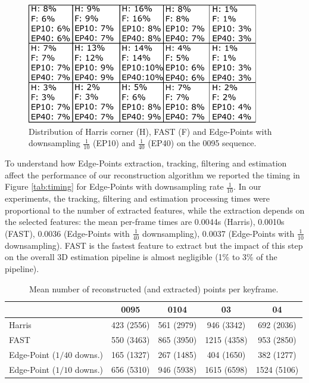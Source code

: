 \begin{figure}[t]
  \centering
  \includegraphics[width=0.9\textwidth]{././img//distribution}
  \caption{Distribution of Harris corner (H), FAST (F) and Edge-Points with downsampling $\frac{1}{10}$ (EP10) and $\frac{1}{40}$ (EP40) on the 0095 sequence.}
   \label{fig:distr}
\end{figure}


To understand how Edge-Points extraction, tracking, filtering and estimation affect the performance of our reconstruction algorithm we reported the timing in Figure \ref{tab:timing} for Edge-Points with downsampling rate $\frac{1}{10}$.
In our experiments, the tracking, filtering and estimation processing times were proportional to the number of extracted features, while the extraction depends on the selected features: the mean per-frame times are 0.0044s (Harris),  0.0010s (FAST),  0.0036 (Edge-Points with $\frac{1}{40}$ downsampling),  0.0037 (Edge-Points with $\frac{1}{10}$ downsampling). FAST is the fastest feature to extract but the impact of this step on the overall 3D estimation pipeline is almost negligible (1\% to 3\% of the pipeline).



\begin{table}[t]
  \caption{Mean number of reconstructed (and extracted) points per keyframe.}
    \label{tab:reconstrPt}
   \centering
   \begin{tabular}{p{}cccc}
   \toprule 
                                              & 0095            & 0104        &  03         & 04   \\
   \hline   
   {Harris}                                   & 423 (2556)      & 561 (2979)  & 946 (3342)  & 692 (2036) \\
   {FAST}                                     & 550 (3463)      & 865 (3950)  & 1215 (4358) & 953 (2850) \\
  {Edge-Point (${1}/{40}$ downs.)}   & 165 (1327)      & 267 (1485)  & 404 (1650)  & 382 (1277) \\
   {Edge-Point (${1}/{10}$ downs.)}  & 656 (5310)      & 946 (5938)  & 1615 (6598) & 1524 (5106)  \\
    \bottomrule
  \end{tabular}
  \end{table} 
  

